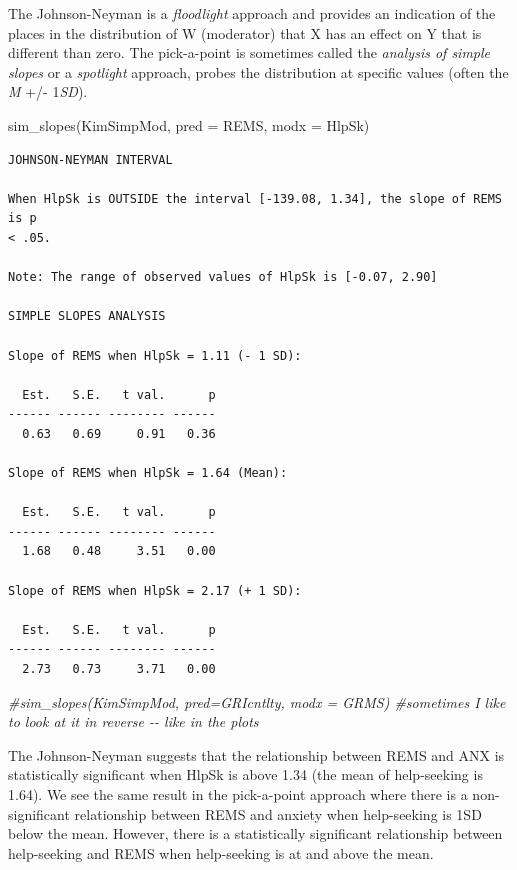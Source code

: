 \documentclass[
]{book}
\newenvironment{Shaded}{\begin{snugshade}}{\end{snugshade}}
\newcommand{\AttributeTok}[1]{\textcolor[rgb]{0.77,0.63,0.00}{#1}}
\newcommand{\CommentTok}[1]{\textcolor[rgb]{0.56,0.35,0.01}{\textit{#1}}}
\newcommand{\FunctionTok}[1]{\textcolor[rgb]{0.00,0.00,0.00}{#1}}
\newcommand{\NormalTok}[1]{#1}
\begin{document}
The Johnson-Neyman is a \emph{floodlight} approach and provides an indication of the places in the distribution of W (moderator) that X has an effect on Y that is different than zero. The pick-a-point is sometimes called the \emph{analysis of simple slopes} or a \emph{spotlight} approach, probes the distribution at specific values (often the \emph{M} +/- 1\emph{SD}).

\begin{Shaded}
\begin{Highlighting}[]
\FunctionTok{sim\_slopes}\NormalTok{(KimSimpMod, }\AttributeTok{pred =}\NormalTok{ REMS, }\AttributeTok{modx =}\NormalTok{ HlpSk)}
\end{Highlighting}
\end{Shaded}

\begin{verbatim}
JOHNSON-NEYMAN INTERVAL 

When HlpSk is OUTSIDE the interval [-139.08, 1.34], the slope of REMS is p
< .05.

Note: The range of observed values of HlpSk is [-0.07, 2.90]

SIMPLE SLOPES ANALYSIS 

Slope of REMS when HlpSk = 1.11 (- 1 SD): 

  Est.   S.E.   t val.      p
------ ------ -------- ------
  0.63   0.69     0.91   0.36

Slope of REMS when HlpSk = 1.64 (Mean): 

  Est.   S.E.   t val.      p
------ ------ -------- ------
  1.68   0.48     3.51   0.00

Slope of REMS when HlpSk = 2.17 (+ 1 SD): 

  Est.   S.E.   t val.      p
------ ------ -------- ------
  2.73   0.73     3.71   0.00
\end{verbatim}

\begin{Shaded}
\begin{Highlighting}[]
\CommentTok{\#sim\_slopes(KimSimpMod, pred=GRIcntlty, modx = GRMS) \#sometimes I like to look at it in reverse {-}{-} like in the plots}
\end{Highlighting}
\end{Shaded}

The Johnson-Neyman suggests that the relationship between REMS and ANX is statistically significant when HlpSk is above 1.34 (the mean of help-seeking is 1.64). We see the same result in the pick-a-point approach where there is a non-significant relationship between REMS and anxiety when help-seeking is 1SD below the mean. However, there is a statistically significant relationship between help-seeking and REMS when help-seeking is at and above the mean.
\end{document}
